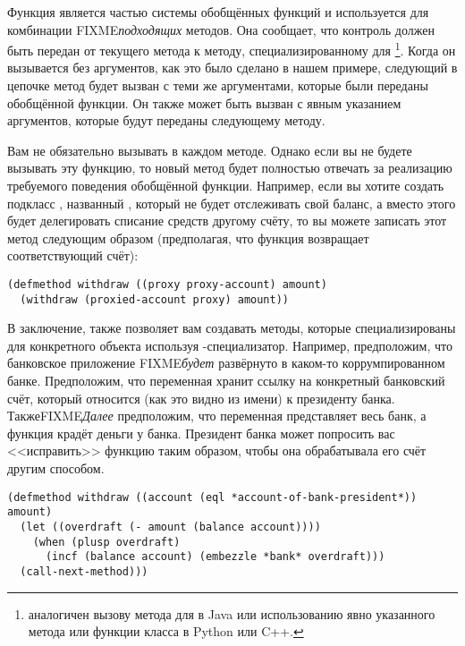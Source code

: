 Функция  является частью системы обобщённых функций и используется
для комбинации FIXME\textit{подходящих} методов.  Она сообщает, что контроль должен быть
передан от текущего метода к методу, специализированному для
\footnote{ аналогичен вызову метода для
   в Java или использованию явно указанного метода или функции класса в Python
  или C++.}.  Когда он вызывается без аргументов, как это было сделано в нашем примере,
следующий в цепочке метод будет вызван с теми же аргументами, которые были переданы
обобщённой функции.  Он также может быть вызван с явным указанием аргументов, которые
будут переданы следующему методу.

Вам не обязательно вызывать  в каждом методе.  Однако если вы не
будете вызывать эту функцию, то новый метод будет полностью отвечать за реализацию
требуемого поведения обобщённой функции.  Например, если вы хотите создать подкласс
, названный , который не будет отслеживать свой
баланс, а вместо этого будет делегировать списание средств другому счёту, то вы можете
записать этот метод следующим образом (предполагая, что функция 
возвращает соответствующий счёт):

\begin{lstlisting}
(defmethod withdraw ((proxy proxy-account) amount)
  (withdraw (proxied-account proxy) amount))
\end{lstlisting}

В заключение,  также позволяет вам создавать методы, которые
специализированы для конкретного объекта используя -специализатор.  Например,
предположим, что банковское приложение FIXME\textit{будет} развёрнуто в каком-то
коррумпированном банке.  Предположим, что переменная 
хранит ссылку на конкретный банковский счёт, который относится (как это видно из имени) к
президенту банка.  ТакжеFIXME\textit{Далее} предположим, что переменная 
представляет весь банк, а функция  крадёт деньги у банка.  Президент банка
может попросить вас <<исправить>> функцию  таким образом, чтобы она
обрабатывала его счёт другим способом.

\begin{lstlisting}
(defmethod withdraw ((account (eql *account-of-bank-president*)) amount)
  (let ((overdraft (- amount (balance account))))
    (when (plusp overdraft)
      (incf (balance account) (embezzle *bank* overdraft)))
  (call-next-method)))
\end{lstlisting}

